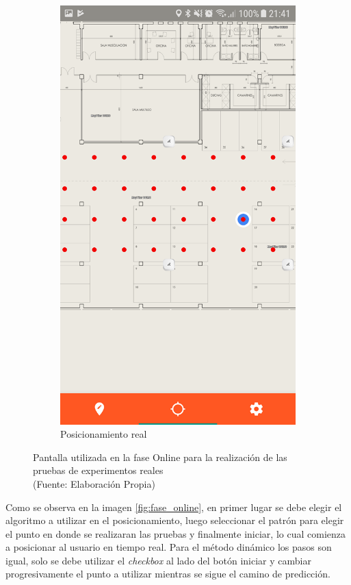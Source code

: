 \begin{figure}[ht!]
\begin{subfigure}{.3\textwidth}
  \includegraphics[width=.8\linewidth]{figures/fase_online3.png}
  \caption{Posicionamiento real}
  \label{fig:online3}
\end{subfigure}
\caption[abs]{Pantalla utilizada en la fase Online para la realización de las pruebas de experimentos reales \\
{\scriptsize (Fuente: Elaboración Propia)}}
\label{fig:fase_online}
\end{figure}

Como se observa en la imagen \autoref{fig:fase_online}, en primer lugar se debe elegir el algoritmo a utilizar en el posicionamiento, luego seleccionar el patrón para elegir el punto en donde se realizaran las pruebas y finalmente iniciar, lo cual comienza a posicionar al usuario en tiempo real. Para el método dinámico los pasos son igual, solo se debe utilizar el \textit{checkbox} al lado del botón iniciar y cambiar progresivamente el punto a utilizar mientras se sigue el camino de predicción.

